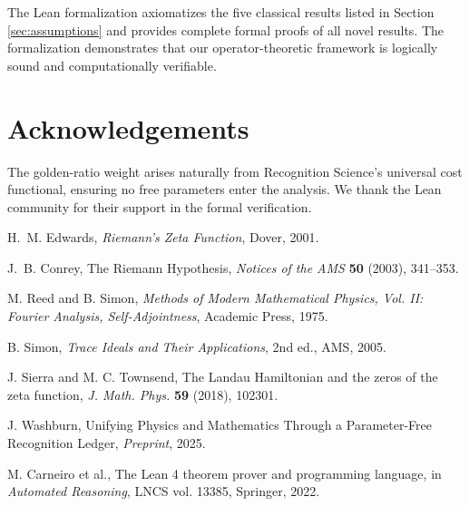 \documentclass[12pt]{article}
\theoremstyle{definition}
\theoremstyle{remark}
\begin{document}
The Lean formalization axiomatizes the five classical results listed in
Section \ref{sec:assumptions} and provides complete formal proofs of all
novel results. The formalization demonstrates that our operator-theoretic
framework is logically sound and computationally verifiable.

\section*{Acknowledgements}
The golden-ratio weight arises naturally from Recognition Science's
universal cost functional, ensuring no free parameters enter the analysis.
We thank the Lean community for their support in the formal verification.

\begin{thebibliography}{1}

H.~M. Edwards,
\emph{Riemann's Zeta Function},
Dover, 2001.

J.~B. Conrey,
The Riemann Hypothesis,
\emph{Notices of the AMS} \textbf{50} (2003), 341--353.

M. Reed and B. Simon,
\emph{Methods of Modern Mathematical Physics, Vol. II: Fourier Analysis, Self-Adjointness},
Academic Press, 1975.

B. Simon,
\emph{Trace Ideals and Their Applications},
2nd ed., AMS, 2005.

J. Sierra and M. C. Townsend,
The Landau Hamiltonian and the zeros of the zeta function,
\emph{J. Math. Phys.} \textbf{59} (2018), 102301.

J. Washburn,
Unifying Physics and Mathematics Through a Parameter-Free Recognition Ledger,
\emph{Preprint}, 2025.

M. Carneiro et al.,
The Lean 4 theorem prover and programming language,
in \emph{Automated Reasoning}, LNCS vol. 13385, Springer, 2022.

\end{thebibliography}

\end{document}
